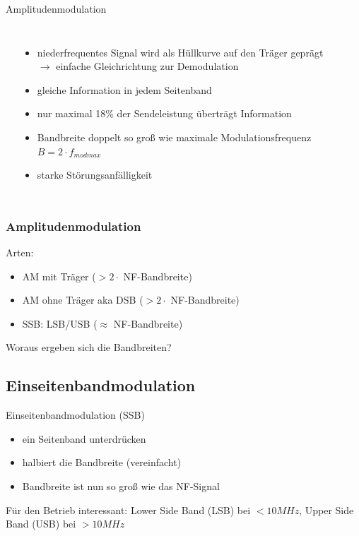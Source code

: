 \begin{frame}{Amplitudenmodulation}
\begin{columns}[c]
      {\tiny \hyperlink{refs}{\cite{wm}}}
      \begin{itemize}
        \item niederfrequentes Signal wird als Hüllkurve auf den Träger geprägt
              \\ $\rightarrow$ einfache Gleichrichtung zur Demodulation
        \item gleiche Information in jedem Seitenband
        \item nur maximal 18\% der Sendeleistung überträgt Information
        \item Bandbreite doppelt so groß wie maximale Modulationsfrequenz $B = 2 \cdot f_{mod max}$
        \item starke Störungsanfälligkeit
      \end{itemize}
  \end{columns}
\end{frame}

\begin{frame}
    \frametitle{Amplitudenmodulation}

    Arten:

    \begin{itemize}
        \item AM mit Träger ($> 2 \cdot$ NF-Bandbreite)
        \item AM ohne Träger aka DSB ($> 2 \cdot$ NF-Bandbreite)
        \item SSB: LSB/USB ($\approx$ NF-Bandbreite)
    \end{itemize}


    \vspace{2em} Woraus ergeben sich die Bandbreiten?

\end{frame}

\subsection[SSB]{Einseitenbandmodulation}

\begin{frame}{Einseitenbandmodulation (SSB)}

    \begin{itemize}
      \item ein Seitenband unterdrücken
      \item halbiert die Bandbreite (vereinfacht)
      \item Bandbreite ist nun so groß wie das NF-Signal
    \end{itemize}

    \bigskip Für den Betrieb interessant: Lower Side Band (LSB) bei $<10MHz$, Upper Side Band (USB) bei $>10MHz$

\end{frame}

